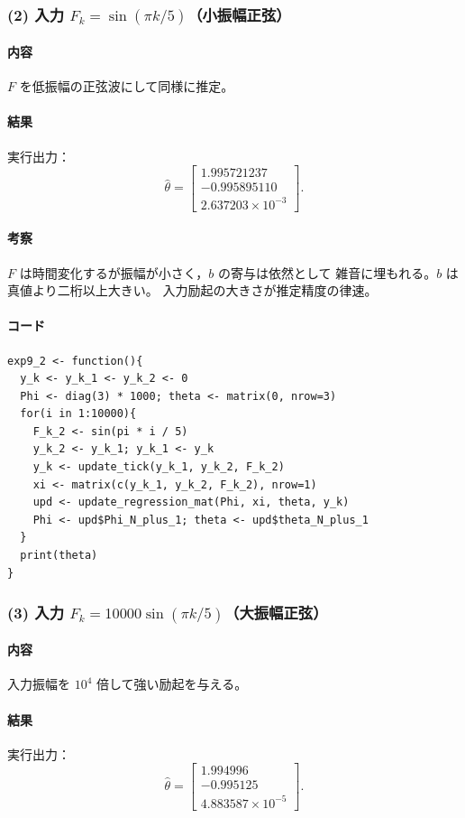 \subsubsection*{(2) 入力 $F_k=\sin(\pi k/5)$（小振幅正弦）}
\paragraph{内容}
$F$ を低振幅の正弦波にして同様に推定。\cite{exp2025}

\paragraph{結果}
実行出力：
\[
\hat\theta=
\begin{bmatrix}
1.995721237\\
-0.995895110\\
2.637203\times10^{-3}
\end{bmatrix}.
\]

\paragraph{考察}
$F$ は時間変化するが振幅が小さく，$b$ の寄与は依然として
雑音に埋もれる。$b$ は真値より二桁以上大きい。
入力励起の大きさが推定精度の律速。

\paragraph{コード}
\begin{lstlisting}
exp9_2 <- function(){
  y_k <- y_k_1 <- y_k_2 <- 0
  Phi <- diag(3) * 1000; theta <- matrix(0, nrow=3)
  for(i in 1:10000){
    F_k_2 <- sin(pi * i / 5)
    y_k_2 <- y_k_1; y_k_1 <- y_k
    y_k <- update_tick(y_k_1, y_k_2, F_k_2)
    xi <- matrix(c(y_k_1, y_k_2, F_k_2), nrow=1)
    upd <- update_regression_mat(Phi, xi, theta, y_k)
    Phi <- upd$Phi_N_plus_1; theta <- upd$theta_N_plus_1
  }
  print(theta)
}
\end{lstlisting}

\subsubsection*{(3) 入力 $F_k=10000\sin(\pi k/5)$（大振幅正弦）}
\paragraph{内容}
入力振幅を $10^4$ 倍して強い励起を与える。\cite{exp2025}

\paragraph{結果}
実行出力：
\[
\hat\theta=
\begin{bmatrix}
1.994996\\
-0.995125\\
4.883587\times10^{-5}
\end{bmatrix}.
\]

